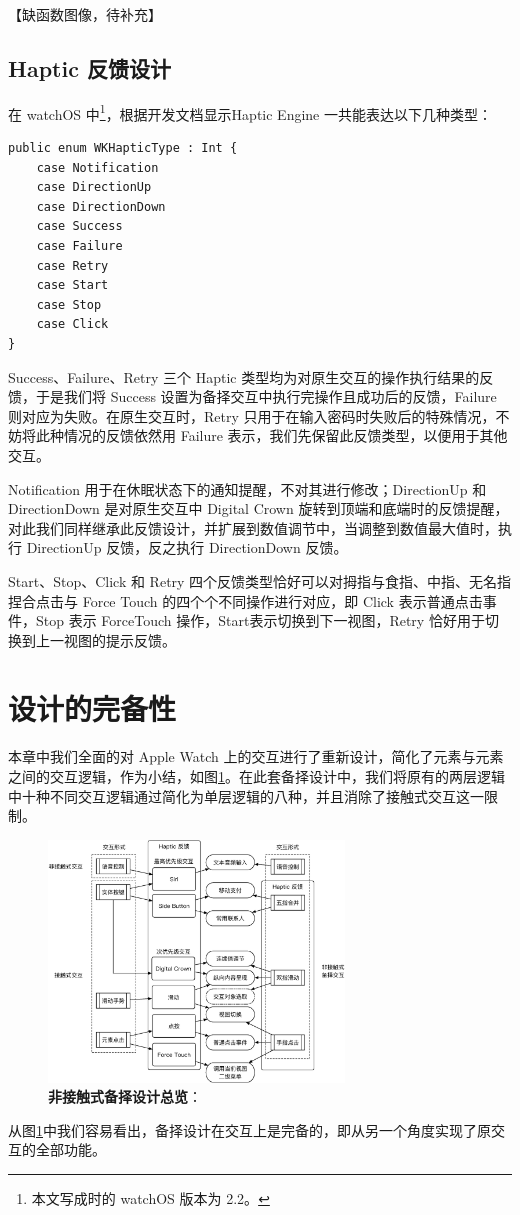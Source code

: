 【缺函数图像，待补充】

\subsection{Haptic 反馈设计}
在 watchOS 中\footnote{本文写成时的 watchOS 版本为 2.2。}，根据开发文档\cite{WatchGuide:2016}显示Haptic Engine 一共能表达以下几种类型：

\begin{lstlisting}
public enum WKHapticType : Int {
    case Notification
    case DirectionUp
    case DirectionDown
    case Success
    case Failure
    case Retry
    case Start
    case Stop
    case Click
}
\end{lstlisting}

Success、Failure、Retry 三个 Haptic 类型均为对原生交互的操作执行结果的反馈，于是我们将 Success 设置为备择交互中执行完操作且成功后的反馈，Failure 则对应为失败。在原生交互时，Retry 只用于在输入密码时失败后的特殊情况，不妨将此种情况的反馈依然用 Failure 表示，我们先保留此反馈类型，以便用于其他交互。

Notification 用于在休眠状态下的通知提醒，不对其进行修改；DirectionUp 和 DirectionDown 是对原生交互中 Digital Crown 旋转到顶端和底端时的反馈提醒，对此我们同样继承此反馈设计，并扩展到数值调节中，当调整到数值最大值时，执行 DirectionUp 反馈，反之执行 DirectionDown 反馈。

Start、Stop、Click 和 Retry 四个反馈类型恰好可以对拇指与食指、中指、无名指捏合点击与 Force Touch 的四个个不同操作进行对应，即 Click 表示普通点击事件，Stop 表示 ForceTouch 操作，Start表示切换到下一视图，Retry 恰好用于切换到上一视图的提示反馈。

\section{设计的完备性}

本章中我们全面的对 Apple Watch 上的交互进行了重新设计，简化了元素与元素之间的交互逻辑，作为小结，如图\ref{fig:interaction}。在此套备择设计中，我们将原有的两层逻辑中十种不同交互逻辑通过简化为单层逻辑的八种，并且消除了接触式交互这一限制。

\begin{figure}[H]
    \centering
    \includegraphics[width=0.7\textwidth]{figures/interaction}
    \caption{\kaishu \textbf{非接触式备择设计总览}：}
    \label{fig:interaction}
\end{figure}

从图\ref{fig:interaction}中我们容易看出，备择设计在交互上是完备的，即从另一个角度实现了原交互的全部功能。
